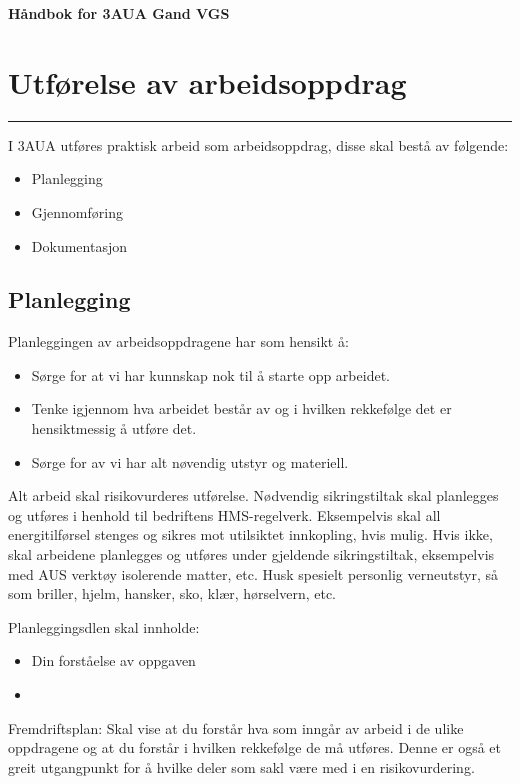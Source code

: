 \documentclass[10pt,a5paper]{article}
\begin{document}
\huge
\centerline \textbf{Håndbok for 3AUA Gand VGS} \bigskip
\normalsize
\vfil \eject
\section {Utførelse av arbeidsoppdrag}
\hrule

\vskip 1cm

I 3AUA utføres praktisk arbeid som arbeidsoppdrag, disse skal bestå av følgende:\begin{itemize}[noitemsep]
	\item Planlegging
	\item Gjennomføring
	\item Dokumentasjon
\end{itemize}

\subsection {Planlegging}

Planleggingen av arbeidsoppdragene har som hensikt å:

\begin{itemize}[noitemsep]
	\item Sørge for at vi har kunnskap nok til å starte opp arbeidet. 
	\item Tenke igjennom hva arbeidet består av og i hvilken rekkefølge det er hensiktmessig å utføre det. 
	\item Sørge for av vi har alt nøvendig utstyr og materiell. 
\end{itemize}



Alt arbeid skal risikovurderes utførelse. Nødvendig sikringstiltak skal planlegges og utføres i henhold til bedriftens HMS-regelverk. Eksempelvis skal all energitilførsel stenges og sikres mot utilsiktet innkopling, hvis mulig. Hvis ikke, skal arbeidene planlegges og utføres under gjeldende sikringstiltak, eksempelvis med AUS verktøy isolerende matter, etc. Husk spesielt personlig verneutstyr, så som briller, hjelm, hansker, sko, klær, hørselvern, etc.

Planleggingsdlen skal innholde:\begin{itemize}[noitemsep]
	\item Din forståelse av oppgaven
	\item 
\end{itemize}

Fremdriftsplan:
\vskip 5pt 
Skal vise at du forstår hva som inngår av arbeid i de ulike oppdragene og at du forstår i hvilken rekkefølge de må utføres. Denne er også et greit utgangpunkt for å hvilke deler som sakl være med i en risikovurdering. 
\end{document}

